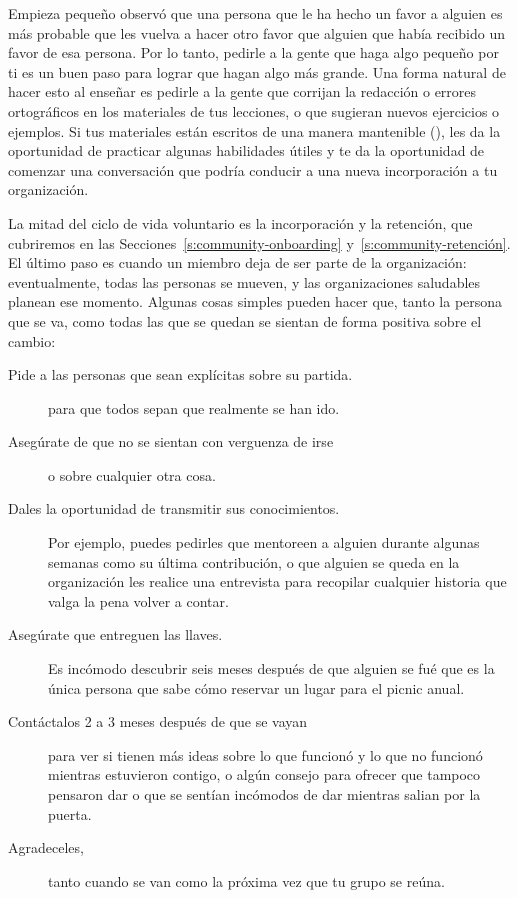 \begin{aside}{Empieza pequeño}
   observó que
  una persona que le ha hecho un favor a alguien
  es más probable que les vuelva a hacer otro favor
  que alguien que había recibido un favor de esa persona.
  Por lo tanto, pedirle a la gente que haga algo pequeño por ti
  es un buen paso para lograr que hagan algo más grande.
  Una forma natural de hacer esto al enseñar
  es pedirle a la gente que corrijan la redacción o errores ortográficos en los materiales de tus lecciones,
  o que sugieran nuevos ejercicios o ejemplos.
  Si tus materiales están escritos de una manera mantenible (),
  les da la oportunidad de practicar algunas habilidades útiles
  y te da la oportunidad de comenzar una conversación
  que podría conducir a una nueva incorporación a tu organización.
\end{aside}


La mitad del ciclo de vida voluntario es la incorporación y la retención,
que cubriremos en las Secciones~\ref{s:community-onboarding} y~\ref{s:community-retención}.
El último paso es cuando un miembro deja de ser parte de la organización:
eventualmente, todas las personas se mueven,
y las organizaciones saludables planean ese momento.
Algunas cosas simples pueden hacer que, tanto la persona que se va, como todas las que se quedan
se sientan de forma positiva sobre el cambio:

\begin{description}

\item[Pide a las personas que sean explícitas sobre su partida.]
  para que todos sepan que realmente se han ido.

\item[Asegúrate de que no se sientan con verguenza de irse]
  o sobre cualquier otra cosa.

\item[Dales la oportunidad de transmitir sus conocimientos.]
  Por ejemplo,
  puedes pedirles que mentoreen a alguien durante algunas semanas como su última contribución,
  o que alguien se queda en la organización les realice una entrevista 
  para recopilar cualquier historia que valga la pena volver a contar.

\item[Asegúrate que entreguen las llaves.]
  Es incómodo descubrir seis meses después de que alguien se fué
  que es la única persona que sabe cómo reservar un lugar para el picnic anual.

\item[Contáctalos 2 a 3 meses después de que se vayan]
  para ver si tienen más ideas sobre lo que funcionó y lo que no funcionó mientras estuvieron contigo,
  o algún consejo para ofrecer que tampoco pensaron dar
  o que se sentían incómodos de dar mientras salian por la puerta.

\item[Agradeceles,]
  tanto cuando se van como la próxima vez que tu grupo se reúna.

\end{description}

